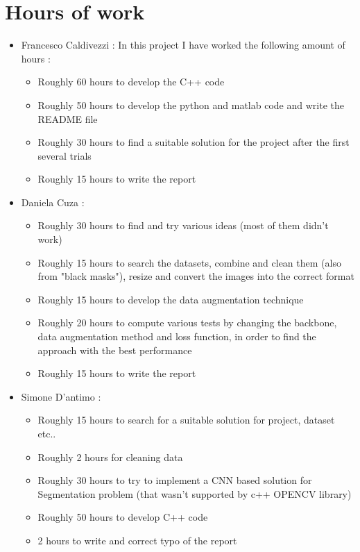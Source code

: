 \section{Hours of work}
    \begin{itemize}
        \item Francesco Caldivezzi : In this project I have worked the following amount of hours : 
        \begin{itemize}
            \item Roughly 60 hours to develop the C++ code
            \item Roughly 50 hours to develop the python and matlab code and write the README file
            \item Roughly 30 hours to find a suitable solution for the project after the first several trials
            \item Roughly 15 hours to write the report
        \end{itemize}
        \item Daniela Cuza :
         \begin{itemize}
            \item Roughly 30 hours to find and try various ideas (most of them didn't work)
             \item Roughly 15 hours to search the datasets, combine and clean them (also from "black masks"), resize and convert the images into the correct format 
             \item Roughly 15 hours to develop the data augmentation technique
             \item Roughly 20 hours to compute various tests by changing the backbone, data augmentation method and loss function, in order to find the approach with the best performance
             \item Roughly 15 hours to write the report
         \end{itemize}   
        \item Simone D'antimo :
                    \begin{itemize}
            \item Roughly 15 hours to search for a suitable solution for project, dataset etc.. 
            \item Roughly 2 hours for cleaning data
            \item Roughly 30 hours to try to implement a CNN based solution for Segmentation problem (that wasn't supported by c++ OPENCV library) 
            \item Roughly 50 hours to develop C++ code
            \item 2 hours to write and correct typo of the report
        \end{itemize}
    \end{itemize}